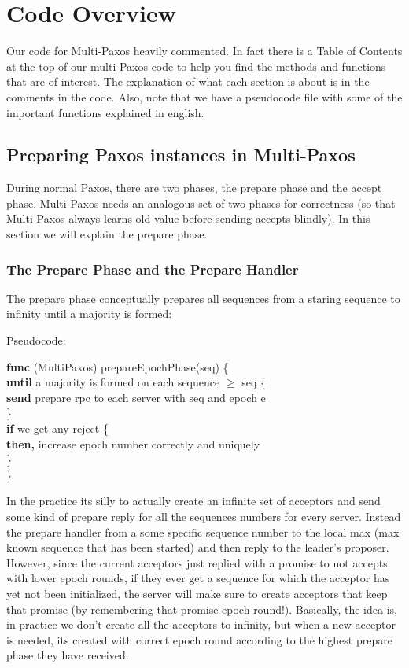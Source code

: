 \documentclass[a4paper]{article}
\begin{document}
\section{Code Overview}

Our code for Multi-Paxos heavily commented. In fact there is a Table of Contents at the top of our multi-Paxos code to help you find the methods and functions that are of interest.
The explanation of what each section is about is in the comments in the code.
Also, note that we have a pseudocode file with some of the important functions explained in english.

\subsection{Preparing Paxos instances in Multi-Paxos}

During normal Paxos, there are two phases, the prepare phase and the accept phase. 
Multi-Paxos needs an analogous set of two phases for correctness (so that Multi-Paxos always learns old value before sending accepts blindly). 
In this section we will explain the prepare phase.

\subsubsection{The Prepare Phase and the Prepare Handler}

The prepare phase conceptually prepares all sequences from a staring sequence to infinity until a majority is formed:

Pseudocode:

\textbf{func} (MultiPaxos) prepareEpochPhase(seq) \{ \\
\indent \indent \textbf{until} a majority is formed on each sequence $\geq$ seq \{ \\
\indent \indent \indent \textbf{send} prepare rpc to each server with seq and epoch e \\
\indent \indent  \} \\
\indent \indent \textbf{if} we get any reject \{ \\
\indent \indent \indent \textbf{then,} increase epoch number correctly and uniquely \\
\indent \indent \} \\
\indent \}

In the practice its silly to actually create an infinite set of acceptors and send some kind of prepare reply for all the sequences numbers for every server.
Instead the prepare handler from a some specific sequence number to the local max (max known sequence that has been started) and then reply to the leader's proposer.
However, since the current acceptors just replied with a promise to not accepts with lower epoch rounds, if they ever get a sequence for which the acceptor has yet not been initialized, the server will make sure to create acceptors that keep that promise (by remembering that promise epoch round!).
Basically, the idea is, in practice we don't create all the acceptors to infinity, but when a new acceptor is needed, its created with correct epoch round according to the highest prepare phase they have received.
\end{document}
